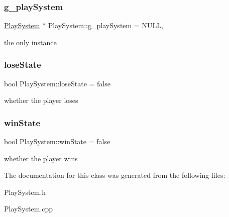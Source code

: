 \subsubsection{\texorpdfstring{g\+\_\+play\+System}{g\_playSystem}}
{\footnotesize\ttfamily \mbox{\hyperlink{class_play_system}{Play\+System}} $\ast$ Play\+System\+::g\+\_\+play\+System = N\+U\+LL\hspace{0.3cm}{\ttfamily [static]}, {\ttfamily [private]}}

the only instance \mbox{\label{class_play_system_a76a5ce42d2b9112171f587b04f992d59}} 
\subsubsection{\texorpdfstring{lose\+State}{loseState}}
{\footnotesize\ttfamily bool Play\+System\+::lose\+State = false\hspace{0.3cm}{\ttfamily [private]}}

whether the player loses \mbox{\label{class_play_system_a259c6f581bfcace63445ffac48d8675f}} 
\subsubsection{\texorpdfstring{win\+State}{winState}}
{\footnotesize\ttfamily bool Play\+System\+::win\+State = false\hspace{0.3cm}{\ttfamily [private]}}

whether the player wins 

The documentation for this class was generated from the following files\+:\begin{DoxyCompactItemize}
\item 
Play\+System.\+h\item 
Play\+System.\+cpp\end{DoxyCompactItemize}

